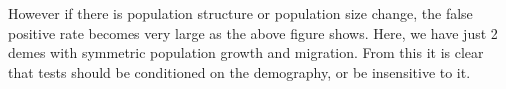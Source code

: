 \documentclass[portrait,final]{baposter}
\begin{document}
\begin{poster}
{\begin{center}
\end{center}
\vspace{-.25cm}
However if there is population structure or population size change, the
false positive rate becomes very large as the above figure shows. Here, we have
just 2 demes with symmetric population growth and migration. From this it is
clear that tests should be conditioned on the demography, or be insensitive to
it. 
\vspace{.5em}
}

% 
% 
% 
% 
 




\end{poster}
\end{document}
